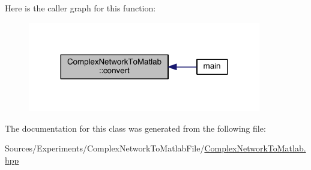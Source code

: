 Here is the caller graph for this function\+:\nopagebreak
\begin{figure}[H]
\begin{center}
\leavevmode
\includegraphics[width=288pt]{class_complex_network_to_matlab_a8d0d921690e8d376364c733c45c0f777_icgraph}
\end{center}
\end{figure}




The documentation for this class was generated from the following file\+:\begin{DoxyCompactItemize}
\item 
Sources/\+Experiments/\+Complex\+Network\+To\+Matlab\+File/\hyperlink{_complex_network_to_matlab_8hpp}{Complex\+Network\+To\+Matlab.\+hpp}\end{DoxyCompactItemize}
